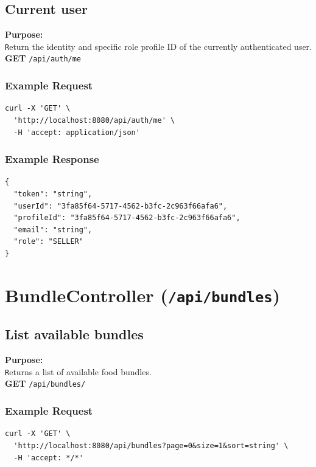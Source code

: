 \documentclass[a4paper,11pt]{article}
\begin{document}
\subsection{Current user}
\textbf{Purpose:} \\ \texttt Return the identity and specific role profile ID of the currently authenticated user. \\


\textbf{GET} \texttt{/api/auth/me}

\subsubsection*{Example Request}
\begin{lstlisting}
curl -X 'GET' \
  'http://localhost:8080/api/auth/me' \
  -H 'accept: application/json'
\end{lstlisting}

\subsubsection*{Example Response}
\begin{lstlisting}
{
  "token": "string",
  "userId": "3fa85f64-5717-4562-b3fc-2c963f66afa6",
  "profileId": "3fa85f64-5717-4562-b3fc-2c963f66afa6",
  "email": "string",
  "role": "SELLER"
}
\end{lstlisting}

\section{BundleController (\texttt{/api/bundles})}

\subsection{List available bundles}
\textbf{Purpose:} \\ \texttt Returns a list of available food bundles. \\

\textbf{GET} \texttt{/api/bundles/{}}

\subsubsection*{Example Request}
\begin{lstlisting}
curl -X 'GET' \
  'http://localhost:8080/api/bundles?page=0&size=1&sort=string' \
  -H 'accept: */*'
\end{lstlisting}
\end{document}

